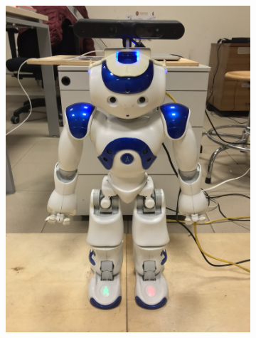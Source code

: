 \begin{figure}
  \begin{subfigure}[b]{0.49\textwidth}
    \includegraphics[width=\textwidth]{figures/NAO-with-xtion.JPEG}
    \caption{}
    \label{fig:nao-with-xtion}
  \end{subfigure}
  \hfill
  \begin{subfigure}[b]{0.49\textwidth}

\end{subfigure}
\end{figure}
